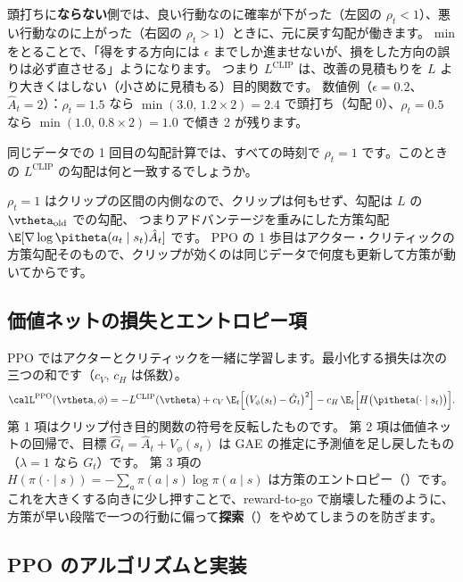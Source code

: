 頭打ちに\textbf{ならない}側では、良い行動なのに確率が下がった（左図の $\rho_t<1$）、悪い行動なのに上がった（右図の $\rho_t>1$）ときに、元に戻す勾配が働きます。
min をとることで、「得をする方向には $\epsilon$ までしか進ませないが、損をした方向の誤りは必ず直させる」ようになります。
つまり $L^{\mathrm{CLIP}}$ は、改善の見積もりを $L$ より大きくはしない（小さめに見積もる）目的関数です。
数値例（$\epsilon=0.2$、$\hat{A}_t=2$）：$\rho_t=1.5$ なら $\min(3.0,\,1.2\times2)=2.4$ で頭打ち（勾配 0）、$\rho_t=0.5$ なら $\min(1.0,\,0.8\times2)=1.0$ で傾き 2 が残ります。

\begin{quiz}
同じデータでの 1 回目の勾配計算では、すべての時刻で $\rho_t=1$ です。このときの $L^{\mathrm{CLIP}}$ の勾配は何と一致するでしょうか。
\end{quiz}

$\rho_t=1$ はクリップの区間の内側なので、クリップは何もせず、勾配は $L$ の $\vtheta_{\text{old}}$ での勾配、
つまりアドバンテージを重みにした方策勾配 $\E[\nabla\log\pitheta(a_t\mid s_t)\hat{A}_t]$ です。
PPO の 1 歩目はアクター・クリティックの方策勾配そのもので、クリップが効くのは同じデータで何度も更新して方策が動いてからです。

\subsection*{価値ネットの損失とエントロピー項}

PPO ではアクターとクリティックを一緒に学習します。最小化する損失は次の三つの和です（$c_V$, $c_H$ は係数）。
\begin{equation}
\calL^{\mathrm{PPO}}(\vtheta,\phi)=-L^{\mathrm{CLIP}}(\vtheta)
+c_V\,\E_t\Bigl[\bigl(V_\phi(s_t)-\hat{G}_t\bigr)^2\Bigr]
-c_H\,\E_t\Bigl[H\bigl(\pitheta(\cdot\mid s_t)\bigr)\Bigr].
\label{eq:pg-ppo-total}
\end{equation}
第 1 項はクリップ付き目的関数の符号を反転したものです。
第 2 項は価値ネットの回帰で、目標 $\hat{G}_t=\hat{A}_t+V_\phi(s_t)$ は GAE の推定に予測値を足し戻したもの（$\lambda=1$ なら $G_t$）です。
第 3 項の $H(\pi(\cdot\mid s))=-\sum_a\pi(a\mid s)\log\pi(a\mid s)$ は方策のエントロピー（）です。
これを大きくする向きに少し押すことで、reward-to-go で崩壊した種のように、方策が早い段階で一つの行動に偏って\textbf{探索}（）をやめてしまうのを防ぎます。

\subsection*{PPO のアルゴリズムと実装}

